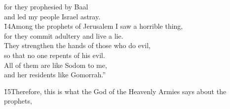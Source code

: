 \begin{poetry}
\poemll    for they prophesied by Baal \\
\poemlll       and led my people Israel astray. \\
\poeml \v{14}Among the prophets of Jerusalem I saw a horrible thing, \\
\poemll    for they commit adultery and live a lie. \\
\poeml They strengthen the hands of those who do evil, \\
\poemll    so that no one repents of his evil. \\
\poeml All of them are like Sodom to me, \\
\poemll    and her residents like Gomorrah.''
\end{poetry}

\v{15}Therefore, this is what the  God of the Heavenly Armies says about the prophets,

